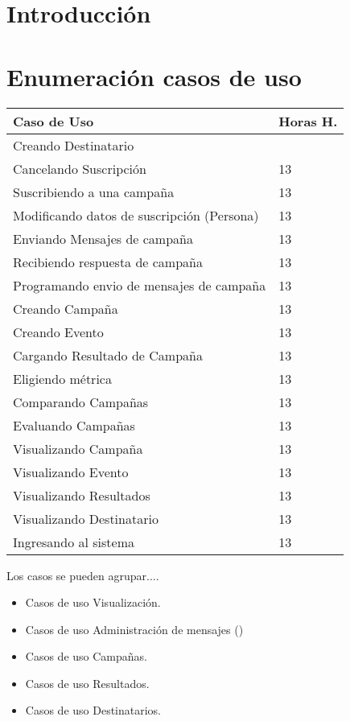 \documentclass[a4paper, 11pt]{article}
\begin{document}
\pagestyle{myheadings}
\maketitle

\thispagestyle{empty}
\tableofcontents

\newpage

\section{Introducción}


\newpage
\section{Enumeraci\'on casos de uso}


\begin{table}[H]
\centering
\begin{tabular}{ | p{10cm} | p{1cm} |}
\hline
Caso de Uso & Horas H.\\ \hline \hline
Creando Destinatario \\ \hline \hline
Cancelando Suscripci\'on& 13 \\ \hline
Suscribiendo a una campaña& 13 \\ \hline
Modificando datos de suscripci\'on (Persona)& 13 \\ \hline
Enviando Mensajes de campaña& 13 \\ \hline
Recibiendo respuesta de campaña& 13 \\ \hline
Programando envio de mensajes de campaña& 13 \\ \hline
Creando Campaña& 13 \\ \hline
Creando Evento& 13 \\ \hline
Cargando Resultado de Campaña& 13 \\ \hline
Eligiendo métrica& 13 \\ \hline
Comparando Campañas& 13 \\ \hline
Evaluando Campañas& 13 \\ \hline
Visualizando Campaña& 13 \\ \hline
Visualizando Evento& 13 \\ \hline
Visualizando Resultados & 13 \\ \hline
Visualizando Destinatario & 13 \\ \hline
Ingresando al sistema & 13 \\ \hline

\end{tabular}
\end{table}
Los casos se pueden agrupar....
\begin{itemize}
\item Casos de uso Visualizaci\'on.
\item Casos de uso Administraci\'on de mensajes ()
\item Casos de uso Campa\~nas.
\item Casos de uso Resultados.
\item Casos de uso Destinatarios.
\end{itemize}
\end{document}
